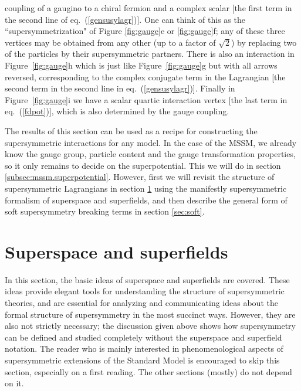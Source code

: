 \documentclass[12pt]{article}
\renewcommand{\theequation}{\arabic{section}.\arabic{equation}}
\begin{document}
coupling of a gaugino to a chiral fermion and a complex scalar [the first
term in the second line of eq.~(\ref{gensusylagr})]. One can think of this
as the ``supersymmetrization" of Figure \ref{fig:gauge}e or
\ref{fig:gauge}f; any of these three vertices may be obtained from any
other (up to a factor of ${\sqrt{2}}$) by replacing two of the particles
by their supersymmetric partners. There is also an interaction in
Figure~\ref{fig:gauge}h which is just like Figure~\ref{fig:gauge}g but
with all arrows reversed, corresponding to the complex conjugate term in
the Lagrangian [the second term in the second line in
eq.~(\ref{gensusylagr})]. Finally in Figure~\ref{fig:gauge}i we have a
scalar quartic interaction vertex [the last term in eq.~(\ref{fdpot})],
which is also determined by the gauge coupling. 

The results of this section can be used as a recipe for constructing the
supersymmetric interactions for any model. In the case of the MSSM, we
already know the gauge group, particle content and the gauge
transformation properties, so it only remains to decide on the
superpotential. This we will do in section
\ref{subsec:mssm.superpotential}. However, first we will revisit the structure of
supersymmetric Lagrangians in section \ref{sec:superfields} using the manifestly
supersymmetric formalism of superspace and superfields, and then describe the
general form of soft supersymmetry breaking terms in section \ref{sec:soft}.

\section{Superspace and superfields}\label{sec:superfields}
\setcounter{figure}{0}
\setcounter{table}{0}
\setcounter{footnote}{2}
\renewcommand{\theequation}{\arabic{section}.\arabic{subsection}.\arabic{equation}}

In this section, the basic ideas of superspace and superfields are covered. These ideas
provide elegant tools for understanding the structure of supersymmetric theories, and
are essential for analyzing and 
communicating ideas about the formal structure of supersymmetry
in the most succinct ways. However, they are also not strictly necessary; 
the discussion given above shows how supersymmetry can be defined and studied
completely without the superspace and superfield notation. The reader who is mainly 
interested in phenomenological aspects of supersymmetric extensions 
of the Standard Model is encouraged to skip this section, especially
on a first reading. The other sections (mostly) do not depend on it.
\end{document}

